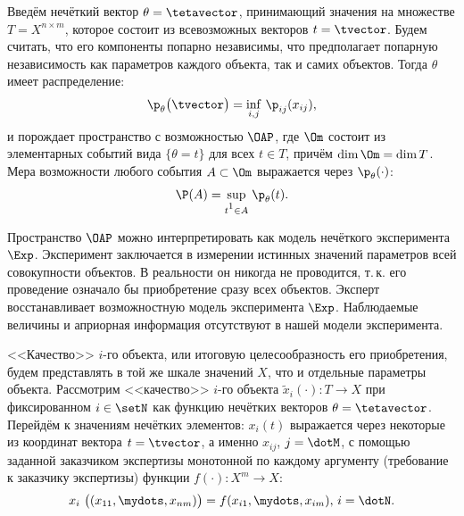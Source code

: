 Введём нечёткий вектор $\theta = \tetavector$, принимающий значения на множестве $T = X^{n \times m}$, которое состоит из всевозможных векторов $t = \tvector$. Будем считать, что его компоненты попарно независимы, что предполагает попарную независимость как параметров каждого объекта, так и самих объектов. Тогда $\theta$ имеет распределение: 
\begin{equation} 
	\label{e:p_theta_def}
	\p_{\theta}\big(\tvector\big) = \inf_{i, j}\,\p_{ij}(x_{ij}),
\end{equation}
и порождает пространство с возможностью $\OAP$, где $\Om$ состоит из элементарных событий вида $\{\theta = t\}$ для всех $t \in T$, причём $\dim \Om = \dim T$. Мера возможности любого события $A \subset \Om$ выражается через $\p_{\theta}(\cdot)$: 
\begin{equation} 
	\label{e:P_theta_def}
	\P(A) = \underset{t\footnotemark \in A} \sup\;\p_{\theta}(t). 
\end{equation}
 
Пространство $\OAP$ можно интерпретировать как модель нечёткого эксперимента $\Exp$. Эксперимент  заключается в измерении истинных значений параметров всей совокупности объектов. В реальности он никогда не проводится, т.\,к. его проведение означало бы приобретение сразу всех объектов. Эксперт восстанавливает возможностную модель эксперимента $\Exp$. Наблюдаемые величины и априорная информация отсутствуют в нашей модели эксперимента.

<<Качество>> $i$-го объекта, или итоговую целесообразность его приобретения, будем представлять в той же шкале значений $X$, что и отдельные параметры объекта. Рассмотрим <<качество>> $i$-го объекта $\tilde x_i(\cdot): T \rightarrow X$ при фиксированном $i \in \setN$ как функцию нечётких векторов $\theta = \tetavector$. Перейдём к значениям нечётких элементов: $x_i(t)$ выражается через некоторые из координат вектора $t = \tvector$, а именно $x_{ij}$, $j = \dotM$, с помощью заданной заказчиком экспертизы монотонной по каждому аргументу (требование к заказчику экспертизы) функции $f(\cdot): X^m \rightarrow X$:
\begin{equation}
  \label{e:function_f}
   x_i~\big((x_{11}, \mydots, x_{nm})\big) = f(x_{i1}, \mydots, x_{im}),\,i = \dotN.
\end{equation}

